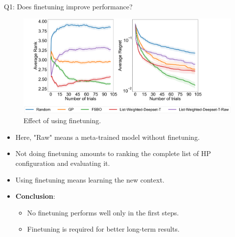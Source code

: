 \documentclass{beamer}
\begin{document}
\begin{frame}[t]{Q1: Does finetuning improve performance?}

\begin{figure}[h]
  \centering
    \includegraphics[scale=0.12]{images/FineTuningAblation}
    \caption{Effect of using finetuning.}
    \label{fig:FineTuningAblation}
\end{figure}

\begin{itemize}
\item Here,  "Raw" means a meta-trained model without finetuning.
\item Not doing finetuning amounts to ranking the complete list of HP configuration and evaluating it.
\item Using finetuning means learning the new context.
\item \textbf{Conclusion}:
\begin{itemize}
\item No finetuning performs well only in the first steps.
\item Finetuning is required for better long-term results.
\end{itemize}
\end{itemize}

\end{frame}
\end{document}

